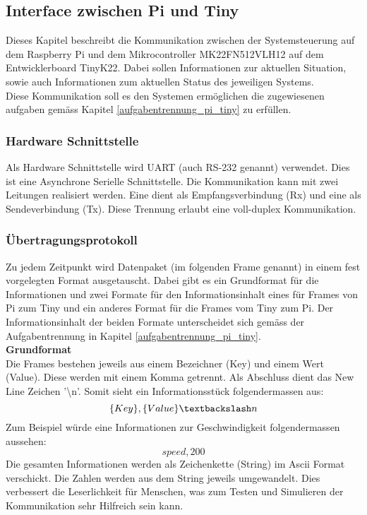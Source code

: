 \documentclass[../../main.tex]{subfiles}
\begin{document}
    \subsection{Interface zwischen Pi und Tiny} \label{interface_pi_tiny}
    Dieses Kapitel beschreibt die Kommunikation zwischen der Systemsteuerung auf dem Raspberry Pi und dem Mikrocontroller MK22FN512VLH12 auf dem Entwicklerboard TinyK22. Dabei sollen Informationen zur aktuellen Situation, sowie auch Informationen zum aktuellen Status des jeweiligen Systems.\\
    Diese Kommunikation soll es den Systemen ermöglichen die zugewiesenen aufgaben gemäss Kapitel \ref{aufgabentrennung_pi_tiny} zu erfüllen.

    \subsubsection{Hardware Schnittstelle}
    Als Hardware Schnittstelle wird UART (auch RS-232 genannt) verwendet. Dies ist eine Asynchrone Serielle Schnittstelle. Die Kommunikation kann mit zwei Leitungen realisiert werden. Eine dient als Empfangsverbindung (Rx) und eine als Sendeverbindung (Tx). Diese Trennung erlaubt eine voll-duplex Kommunikation.

    \subsubsection{Übertragungsprotokoll}
    Zu jedem Zeitpunkt wird Datenpaket (im folgenden Frame genannt) in einem fest vorgelegten Format ausgetauscht. Dabei gibt es ein Grundformat für die Informationen und zwei Formate für den Informationsinhalt eines für Frames von Pi zum Tiny und ein anderes Format für die Frames vom Tiny zum Pi. Der Informationsinhalt der beiden Formate unterscheidet sich gemäss der Aufgabentrennung in Kapitel \ref{aufgabentrennung_pi_tiny}.\\

    \textbf{Grundformat}\\
    Die Frames bestehen jeweils aus einem Bezeichner (Key) und einem Wert (Value). Diese werden mit einem Komma getrennt. Als Abschluss dient das New Line Zeichen '\textbackslash n'. Somit sieht ein Informationsstück folgendermassen aus: $$\{Key\},\{Value\}\textbackslash n$$
    Zum Beispiel würde eine Informationen zur Geschwindigkeit folgendermassen aussehen: $$speed,200$$
    Die gesamten Informationen werden als Zeichenkette (String) im Ascii Format verschickt. Die Zahlen werden aus dem String jeweils umgewandelt. Dies verbessert die Leserlichkeit für Menschen, was zum Testen und Simulieren der Kommunikation sehr Hilfreich sein kann.
\end{document}
